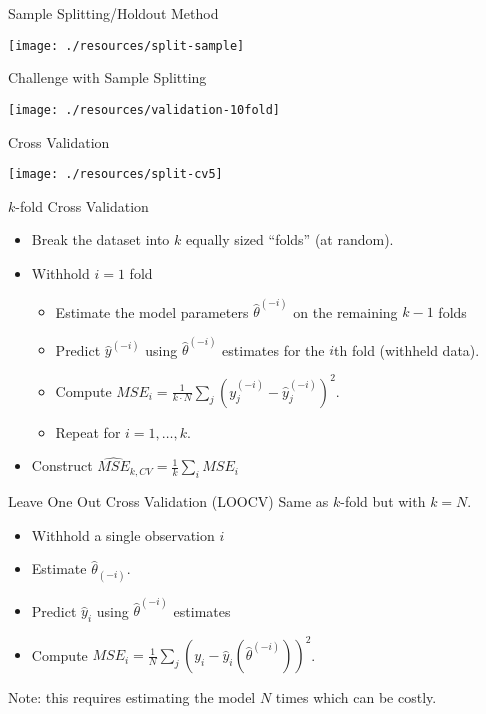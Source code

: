 \documentclass[aspectratio=169]{beamer}
\begin{document}
\begin{frame}{Sample Splitting/Holdout Method}
\begin{center}
\texttt{[image: ./resources/split-sample]}
\end{center}
\end{frame}

\begin{frame}{Challenge with Sample Splitting}
\begin{center}
\texttt{[image: ./resources/validation-10fold]}
\end{center}
\end{frame}


\begin{frame}{Cross Validation}
\begin{center}
\texttt{[image: ./resources/split-cv5]}
\end{center}
\end{frame}

\begin{frame}{$k$-fold Cross Validation}
\begin{itemize}
\item Break the dataset into $k$ equally sized ``folds'' (at random).
\item Withhold $i=1$ fold
\begin{itemize}
\item Estimate the model parameters $\hat{\theta}^{(-i)}$ on the remaining $k-1$ folds
\item Predict $\hat{y}^{(-i)}$ using $\hat{\theta}^{(-i)}$ estimates for the $i$th fold (withheld data).
\item Compute $MSE_i =\frac{1}{k \cdot N} \sum_j (y^{(-i)}_j -\hat{y}^{(-i)}_j)^2$.
\item Repeat for $i=1,\ldots,k$.
\end{itemize}
\item Construct $\widehat{MSE}_{k,CV} = \frac{1}{k} \sum_i MSE_{i}$
\end{itemize}
\end{frame}

\begin{frame}{Leave One Out Cross Validation (LOOCV)}
Same as $k$-fold but with $k=N$.
\begin{itemize}
\item Withhold a single observation $i$
\item Estimate $\hat{\theta}_{(-i)}$.
\item Predict $\hat{y}_i$ using $\hat{\theta}^{(-i)}$ estimates
\item Compute $MSE_i =\frac{1}{N} \sum_j (y_i -\hat{y}_i(\hat{\theta}^{(-i)}))^2$.
\end{itemize}
\vspace{0.2cm}
Note: this requires estimating the model $N$ times which can be costly.
\end{frame}
\end{document}
